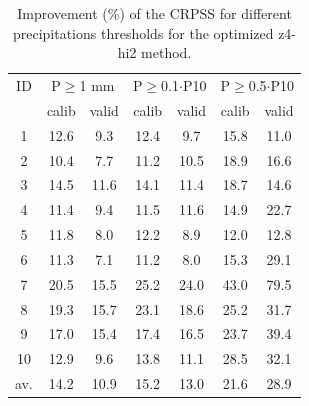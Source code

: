 \documentclass[5p]{elsarticle}
\begin{document}
\begin{table}[htbp]
	\caption{Improvement (\%) of the CRPSS for different precipitations thresholds for the optimized z4-hi2 method.}
	\footnotesize
	\begin{center}
		\begin{tabular}{ccccccc}
			\hline 
			ID & \multicolumn{2}{c}{P\(\geq\)1 mm} & \multicolumn{2}{c}{P\(\geq\)0.1\(\cdot\)P10} & \multicolumn{2}{c}{P\(\geq\)0.5\(\cdot\)P10} \\  
			& calib & valid & calib & valid & calib & valid \\ 
			\hline 
			1 & 12.6 & 9.3 & 12.4 & 9.7 & 15.8 & 11.0 \\
			2 & 10.4 & 7.7 & 11.2 & 10.5 & 18.9 & 16.6 \\ 
			3 & 14.5 & 11.6 & 14.1 & 11.4 & 18.7 & 14.6 \\ 
			4 & 11.4 & 9.4 & 11.5 & 11.6 & 14.9 & 22.7 \\ 
			5 & 11.8 & 8.0 & 12.2 & 8.9 & 12.0 & 12.8 \\ 
			6 & 11.3 & 7.1 & 11.2 & 8.0 & 15.3 & 29.1 \\ 
			7 & 20.5 & 15.5 & 25.2 & 24.0 & 43.0 & 79.5 \\
			8 & 19.3 & 15.7 & 23.1 & 18.6 & 25.2 & 31.7 \\ 
			9 & 17.0 & 15.4 & 17.4 & 16.5 & 23.7 & 39.4 \\ 
			10 & 12.9 & 9.6 & 13.8 & 11.1 & 28.5 & 32.1 \\ 
			\hline 
			av. & 14.2 & 10.9 & 15.2 & 13.0 & 21.6 & 28.9 \\ 
			\hline 
		\end{tabular} 
	\end{center}
	\label{table:scores_thresholds_z4-hi2}
\end{table}
\end{document}
